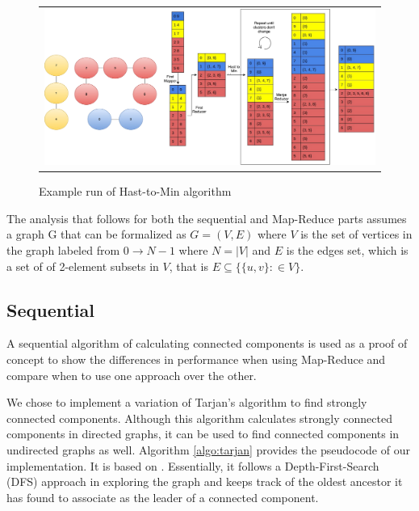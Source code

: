 \begin{figure}[!t]
\begin{tabular}{@{}c@{}}
 	\begin{minipage}{42pc}
 		\centering
 		\includegraphics[width=40pc]{figures/mapreduce_example.pdf}
 		\caption{Example run of Hast-to-Min algorithm}
 		\label{figure:mapreduce_example}
	\end{minipage}
\end{tabular}
\end{figure}

The analysis that follows for both the sequential and Map-Reduce parts assumes a graph G that can be formalized as $G=(V,E)$ where $V$ is the set of vertices in the graph labeled from $0 \to N-1$ where $N=|V|$ and $E$ is the edges set, which is a set of of 2-element subsets in $V$, that is $E \subseteq \{\{u,v\}: \in V\}$.

\subsection{Sequential}
A sequential algorithm of calculating connected components is used as a proof of concept to show the differences in performance when using Map-Reduce and compare when to use one approach over the other.

We chose to implement a variation of Tarjan's algorithm to find strongly connected components. Although this algorithm calculates strongly connected components in directed graphs, it can be used to find connected components in undirected graphs as well. Algorithm \ref{algo:tarjan} provides the pseudocode of our implementation. It is based on \cite{tarjan}. Essentially, it follows a Depth-First-Search (DFS) approach in exploring the graph and keeps track of the oldest ancestor it has found to associate as the leader of a connected component.

